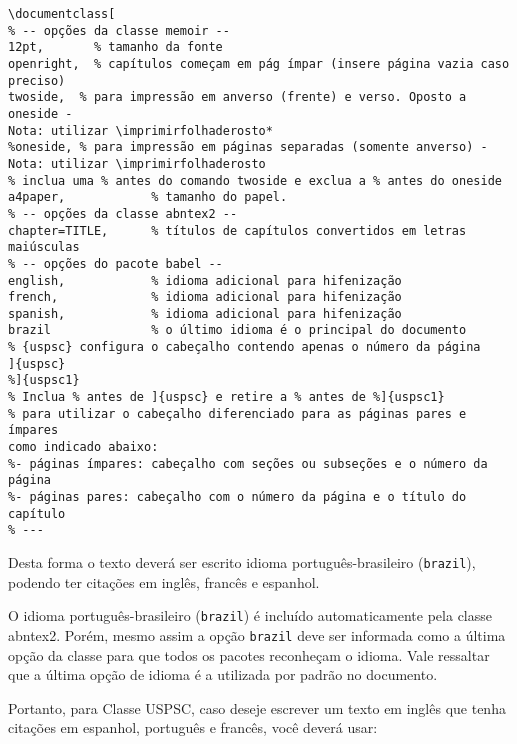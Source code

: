 \begin{verbatim}
\documentclass[
% -- opções da classe memoir --
12pt,		% tamanho da fonte
openright,	% capítulos começam em pág ímpar (insere página vazia caso 
preciso)
twoside,  % para impressão em anverso (frente) e verso. Oposto a oneside - 
Nota: utilizar \imprimirfolhaderosto*
%oneside, % para impressão em páginas separadas (somente anverso) -  
Nota: utilizar \imprimirfolhaderosto
% inclua uma % antes do comando twoside e exclua a % antes do oneside 
a4paper,			% tamanho do papel. 
% -- opções da classe abntex2 --
chapter=TITLE,		% títulos de capítulos convertidos em letras 
maiúsculas
% -- opções do pacote babel --
english,			% idioma adicional para hifenização
french,				% idioma adicional para hifenização
spanish,			% idioma adicional para hifenização
brazil				% o último idioma é o principal do documento
% {uspsc} configura o cabeçalho contendo apenas o número da página
]{uspsc}
%]{uspsc1}
% Inclua % antes de ]{uspsc} e retire a % antes de %]{uspsc1}
% para utilizar o cabeçalho diferenciado para as páginas pares e ímpares 
como indicado abaixo:
%- páginas ímpares: cabeçalho com seções ou subseções e o número da página
%- páginas pares: cabeçalho com o número da página e o título do capítulo 
% ---
\end{verbatim}

Desta forma o texto deverá ser escrito idioma português-brasileiro (\texttt{brazil}), podendo ter citações em inglês, francês e espanhol.

O idioma português-brasileiro (\texttt{brazil}) é incluído automaticamente pela
classe \textsf{abntex2}. Porém, mesmo assim a opção \texttt{brazil} deve ser
informada como a última opção da classe para que todos os pacotes reconheçam o
idioma. Vale ressaltar que a última opção de idioma é a utilizada por padrão no
documento. 

Portanto, para Classe USPSC, caso deseje escrever um texto em inglês que tenha
citações em espanhol, português e francês, você deverá usar:


